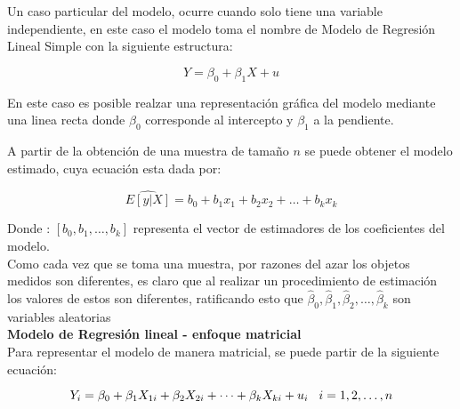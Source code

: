 \documentclass[base=hide,12pt]{elegantbook}
\begin{document}
Un caso particular del modelo, ocurre cuando solo tiene una variable independiente, en este caso el modelo toma el nombre de Modelo de Regresión Lineal Simple con la siguiente estructura:
	
		\begin{Box2}{}
		\begin{equation*}
		Y=\beta_{0} + \beta_{1} X + u
		\end{equation*}
		\end{Box2}
	
En este caso es posible realzar una representación gráfica del modelo mediante una linea recta donde $\beta_{0}$ corresponde al intercepto y $\beta_{1}$  a la pendiente. 


A partir de la obtención de una muestra de tamaño $n$ se puede obtener el modelo estimado, cuya ecuación esta dada por:
\begin{Box2}{}
	\begin{equation*}
	\widehat{E[y|X]}=b_{0}+b_{1}x_{1}+b_{2}x_{2}+\dots+b_{k}x_{k}
	\end{equation*}
\end{Box2}

Donde : $[b_{0}, b_{1}, \dots, b_{k}]$ representa el vector de estimadores de los coeficientes del modelo. \\

Como cada vez que se toma una muestra, por razones del azar los objetos medidos son diferentes, es claro que al realizar un procedimiento de estimación los valores de estos son diferentes, ratificando esto que $\widehat{\beta}_{0},\widehat{\beta}_{1},\widehat{\beta}_{2},\dots, \widehat{\beta}_{k}$  son variables aleatorias \\


\textcolor{col4}{\Large \bf Modelo de Regresión lineal - enfoque matricial}    \\

Para representar el modelo de manera matricial, se puede partir de la siguiente ecuación:
\begin{Box2}{}
	\begin{equation*}
	Y_{i}=\beta_{0}+\beta_{1}X_{1i}+\beta_{2}X_{2i}+ \dots + \beta_{k}X_{ki} +u_{i} \hspace{.3cm} i=1,2,\dots,n
	\end{equation*}
\end{Box2}
	
\end{document}
